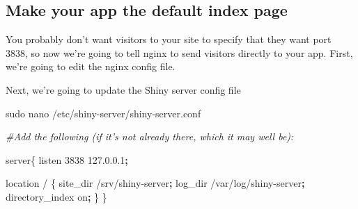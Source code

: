 \documentclass[
]{book}
\newenvironment{Shaded}{\begin{snugshade}}{\end{snugshade}}
\newcommand{\CommentTok}[1]{\textcolor[rgb]{0.56,0.35,0.01}{\textit{#1}}}
\newcommand{\ExtensionTok}[1]{#1}
\newcommand{\FunctionTok}[1]{\textcolor[rgb]{0.00,0.00,0.00}{#1}}
\newcommand{\KeywordTok}[1]{\textcolor[rgb]{0.13,0.29,0.53}{\textbf{#1}}}
\newcommand{\NormalTok}[1]{#1}
\newcommand{\StringTok}[1]{\textcolor[rgb]{0.31,0.60,0.02}{#1}}
\newcommand{\VariableTok}[1]{\textcolor[rgb]{0.00,0.00,0.00}{#1}}
\begin{document}
\hypertarget{make-your-app-the-default-index-page}{%
\subsection{Make your app the default index page}\label{make-your-app-the-default-index-page}}

You probably don't want visitors to your site to specify that they want port 3838, so now we're going to tell nginx to send visitors directly to your app.
First, we're going to edit the nginx config file.

\begin{Shaded}
\end{Shaded}

Next, we're going to update the Shiny server config file

\begin{Shaded}
\begin{Highlighting}[]

\FunctionTok{sudo}\NormalTok{ nano /etc/shiny-server/shiny-server.conf}

\CommentTok{#Add the following (if it’s not already there, which it may well be):}

\ExtensionTok{server}\NormalTok{\{}
    \ExtensionTok{listen}\NormalTok{ 3838 127.0.0.1}\KeywordTok{;}

    \ExtensionTok{location}\NormalTok{ / \{}
      \ExtensionTok{site_dir}\NormalTok{ /srv/shiny-server}\KeywordTok{;}
      \ExtensionTok{log_dir}\NormalTok{ /var/log/shiny-server}\KeywordTok{;}
      \ExtensionTok{directory_index}\NormalTok{ on}\KeywordTok{;}
\NormalTok{    \}}
\NormalTok{\}}
\end{Highlighting}
\end{Shaded}
\end{document}
